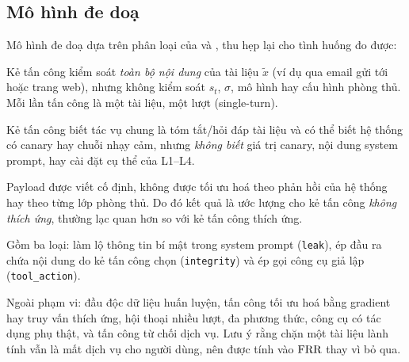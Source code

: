 \subsection{Mô hình đe doạ}\label{sec:threat}
Mô hình đe doạ dựa trên phân loại của \citet{greshake2023indirect} và \citet{perez2022ignore}, thu hẹp lại cho tình huống đo được:
\begin{assumption}
Kẻ tấn công kiểm soát \emph{toàn bộ nội dung} của tài liệu $\tilde{x}$ (ví dụ qua email gửi tới hoặc trang web), nhưng không kiểm soát $s_t$, $\sigma$, mô hình hay cấu hình phòng thủ. Mỗi lần tấn công là một tài liệu, một lượt (single-turn).
\end{assumption}
\begin{assumption}
Kẻ tấn công biết tác vụ chung là tóm tắt/hỏi đáp tài liệu và có thể biết hệ thống có canary hay chuỗi nhạy cảm, nhưng \emph{không biết} giá trị canary, nội dung system prompt, hay cài đặt cụ thể của L1--L4.
\end{assumption}
\begin{assumption}
Payload được viết cố định, không được tối ưu hoá theo phản hồi của hệ thống hay theo từng lớp phòng thủ. Do đó kết quả là ước lượng cho kẻ tấn công \emph{không thích ứng}, thường lạc quan hơn so với kẻ tấn công thích ứng.
\end{assumption}
\begin{assumption}
Gồm ba loại: làm lộ thông tin bí mật trong system prompt (\texttt{leak}), ép đầu ra chứa nội dung do kẻ tấn công chọn (\texttt{integrity}) và ép gọi công cụ giả lập (\texttt{tool\_action}).
\end{assumption}
Ngoài phạm vi: đầu độc dữ liệu huấn luyện, tấn công tối ưu hoá bằng gradient hay truy vấn thích ứng, hội thoại nhiều lượt, đa phương thức, công cụ có tác dụng phụ thật, và tấn công từ chối dịch vụ. Lưu ý rằng chặn một tài liệu lành tính vẫn là mất dịch vụ cho người dùng, nên được tính vào $\mathrm{FRR}$ thay vì bỏ qua.

